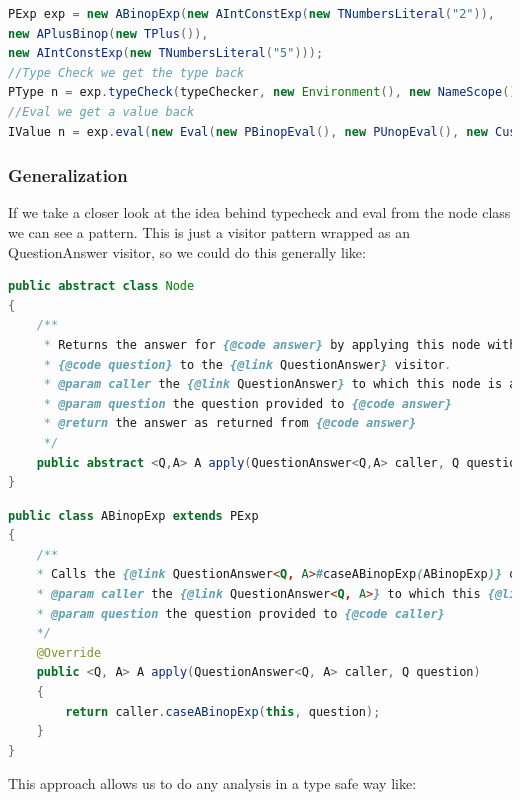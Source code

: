 \documentclass{overturerep}
\begin{document}
\begin{lstlisting}[language=java]
PExp exp = new ABinopExp(new AIntConstExp(new TNumbersLiteral("2")), 
new APlusBinop(new TPlus()), 
new AIntConstExp(new TNumbersLiteral("5")));
//Type Check we get the type back
PType n = exp.typeCheck(typeChecker, new Environment(), new NameScope(), null);
//Eval we get a value back
IValue n = exp.eval(new Eval(new PBinopEval(), new PUnopEval(), new CustomPExpEval(), new PBooleanEval(), new PTypeEval()), null);
\end{lstlisting}

\subsubsection{Generalization}
If we take a closer look at the idea behind typecheck and eval from the node class we can see a pattern. This is just a visitor pattern wrapped as an QuestionAnswer visitor, so we could do this generally like:
\begin{lstlisting}[language=java]
public abstract class Node
{
	/**
	 * Returns the answer for {@code answer} by applying this node with the
	 * {@code question} to the {@link QuestionAnswer} visitor.
	 * @param caller the {@link QuestionAnswer} to which this node is applied
	 * @param question the question provided to {@code answer}
	 * @return the answer as returned from {@code answer}
	 */
	public abstract <Q,A> A apply(QuestionAnswer<Q,A> caller, Q question);
}
\end{lstlisting}

\begin{lstlisting}[language=java]
public class ABinopExp extends PExp
{
	/**
	* Calls the {@link QuestionAnswer<Q, A>#caseABinopExp(ABinopExp)} of the {@link QuestionAnswer<Q, A>} {@code caller}.
	* @param caller the {@link QuestionAnswer<Q, A>} to which this {@link ABinopExp} node is applied
	* @param question the question provided to {@code caller}
	*/
	@Override
	public <Q, A> A apply(QuestionAnswer<Q, A> caller, Q question)
	{
		return caller.caseABinopExp(this, question);
	}
}
\end{lstlisting}
This approach allows us to do any analysis in a type safe way like:
\end{document}
